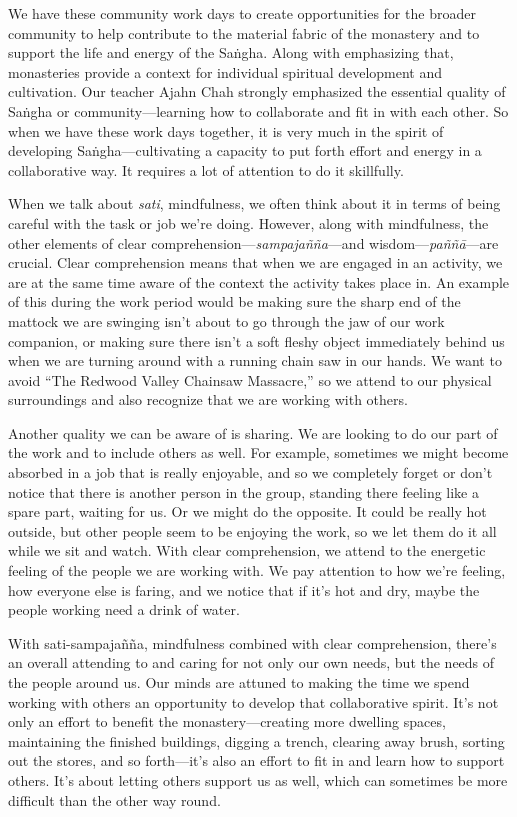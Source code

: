 
We have these community work days to create opportunities for the 
broader community to help contribute to the material fabric of the 
monastery and to support the life and energy of the Saṅgha. Along 
with emphasizing that, monasteries provide a context for individual 
spiritual development and cultivation. Our teacher Ajahn Chah strongly 
emphasized the essential quality of Saṅgha or community---learning 
how to collaborate and fit in with each other. So when we have these 
work days together, it is very much in the spirit of developing 
Saṅgha---cultivating a capacity to put forth effort and energy in a 
collaborative way. It requires a lot of attention to do it skillfully.

When we talk about \emph{sati}, mindfulness, we often think about it in 
terms of being careful with the task or job we're doing. However, along 
with mindfulness, the other elements of clear 
comprehension---\emph{sampajañña}---and 
wisdom---\emph{paññā}---are crucial. Clear comprehension means that 
when we are engaged in an activity, we are at the same time aware of 
the context the activity takes place in. An example of this during the 
work period would be making sure the sharp end of the mattock we are 
swinging isn't about to go through the jaw of our work companion, or 
making sure there isn't a soft fleshy object immediately behind us when 
we are turning around with a running chain saw in our hands. We want to 
avoid ``The Redwood Valley Chainsaw Massacre,'' so we attend to our 
physical surroundings and also recognize that we are working with 
others.

Another quality we can be aware of is sharing. We are looking to do our 
part of the work and to include others as well. For example, sometimes 
we might become absorbed in a job that is really enjoyable, and so we 
completely forget or don't notice that there is another person in the 
group, standing there feeling like a spare part, waiting for us. Or we 
might do the opposite. It could be really hot outside, but other people 
seem to be enjoying the work, so we let them do it all while we sit and 
watch. With clear comprehension, we attend to the energetic feeling of 
the people we are working with. We pay attention to how we're feeling, 
how everyone else is faring, and we notice that if it's hot and dry, 
maybe the people working need a drink of water.

With sati-sampajañña, mindfulness combined with clear comprehension, 
there's an overall attending to and caring for not only our own needs, 
but the needs of the people around us. Our minds are attuned to making 
the time we spend working with others an opportunity to develop that 
collaborative spirit. It's not only an effort to benefit the 
monastery---creating more dwelling spaces, maintaining the finished 
buildings, digging a trench, clearing away brush, sorting out the 
stores, and so forth---it's also an effort to fit in and learn how to 
support others. It's about letting others support us as well, which can 
sometimes be more difficult than the other way round.

